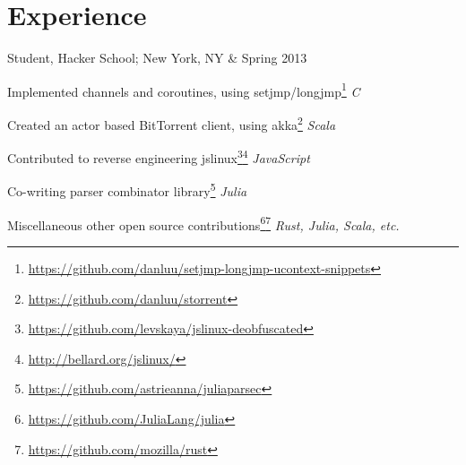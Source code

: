 \documentclass[letterpaper]{scrartcl}
\begin{document}
\section*{Experience}

\begin{list1}
\item \begin{tabular1bold} Student, Hacker School; New York, NY & Spring 2013 \end{tabular1bold}
  \vspace{-8pt}  %
  \begin{list2}
  \item Implemented channels and coroutines, using setjmp/longjmp\footnote{\href{https://github.com/danluu/setjmp-longjmp-ucontext-snippets}{https://github.com/danluu/setjmp-longjmp-ucontext-snippets}} \hfill \emph{C} 
  \item Created an actor based BitTorrent client, using akka\footnote{\href{https://github.com/danluu/storrent}{https://github.com/danluu/storrent}}             \hfill \emph{Scala}
  \item Contributed to reverse engineering jslinux\footnote{\href{https://github.com/levskaya/jslinux-deobfuscated}{https://github.com/levskaya/jslinux-deobfuscated}}\footnote{\href{http://bellard.org/jslinux/}{http://bellard.org/jslinux/}}    \hfill \emph {JavaScript}
  \item Co-writing parser combinator library\footnote{\href{https://github.com/astrieanna/juliaparsec}{https://github.com/astrieanna/juliaparsec}}  \hfill \emph{Julia}
  \item Miscellaneous other open source contributions\footnote{\href{https://github.com/JuliaLang/julia}{https://github.com/JuliaLang/julia}}\footnote{\href{https://github.com/mozilla/rust}{https://github.com/mozilla/rust}} \hfill \emph {Rust, Julia, Scala, etc.}
  \end{list2}


\end{list1}
\end{document}
